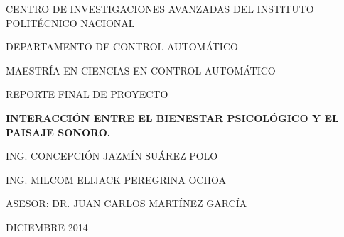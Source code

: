 



% 
%
% 


\begin{center}
CENTRO DE INVESTIGACIONES AVANZADAS DEL INSTITUTO POLIT\'{E}CNICO NACIONAL

DEPARTAMENTO DE CONTROL AUTOM\'{A}TICO

MAESTR\'{I}A EN CIENCIAS EN CONTROL AUTOM\'{A}TICO

REPORTE FINAL DE PROYECTO

\textbf{INTERACCI\'{O}N ENTRE EL BIENESTAR PSICOL\'{O}GICO Y EL PAISAJE
SONORO.}

ING. CONCEPCI\'{O}N JAZM\'{I}N SU\'{A}REZ POLO

ING. MILCOM ELIJACK PEREGRINA OCHOA

ASESOR: DR. JUAN CARLOS MART\'{I}NEZ GARC\'{I}A

\bigskip

DICIEMBRE 2014

\bigskip
\end{center}


